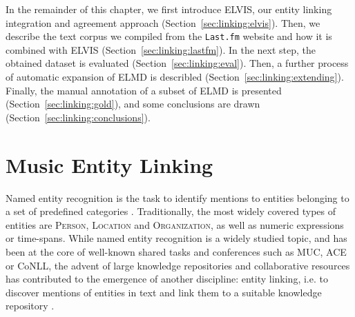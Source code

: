 


In the remainder of this chapter, we first introduce \textsc{ELVIS}, our entity linking integration and agreement approach (Section~\ref{sec:linking:elvis}). Then, we describe the text corpus we compiled from the \texttt{Last.fm} website and how it is combined with ELVIS (Section~\ref{sec:linking:lastfm}). In the next step, the obtained dataset is evaluated (Section~\ref{sec:linking:eval}). Then, a further process of automatic expansion of \textsc{ELMD} is describled (Section~\ref{sec:linking:extending}). Finally, the manual annotation of a subset of \textsc{ELMD} is presented (Section~\ref{sec:linking:gold}), and some conclusions are drawn (Section~\ref{sec:linking:conclusions}). %


\section{Music Entity Linking}
\label{sec:linking:el}


Named entity recognition is the task to identify mentions to entities belonging to a set of predefined categories \citep{ZhouandJian2002}. Traditionally, the most widely covered types of entities are \textsc{Person}, \textsc{Location} and \textsc{Organization}, as well as numeric expressions or time-spans. While named entity recognition is a widely studied topic, and has been at the core of well-known shared tasks and conferences \citep{Nadeau2007} such as MUC, ACE or CoNLL, the advent of large knowledge repositories and collaborative resources has contributed to the emergence of another discipline: entity linking, i.e. to discover mentions of entities in text and link them to a suitable knowledge repository \citep{Moroetal2014}.

